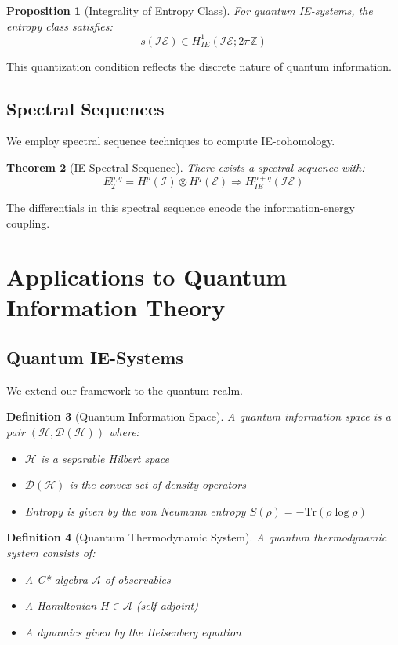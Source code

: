 \documentclass[12pt]{article}
\newtheorem{theorem}{Theorem}[section]
\newtheorem{proposition}[theorem]{Proposition}
\newtheorem{definition}[theorem]{Definition}
\begin{document}
\begin{proposition}[Integrality of Entropy Class]
For quantum IE-systems, the entropy class satisfies:
\[s(\mathcal{IE}) \in H^1_{IE}(\mathcal{IE}; 2\pi\mathbb{Z})\]
\end{proposition}

This quantization condition reflects the discrete nature of quantum information.

\subsection{Spectral Sequences}

We employ spectral sequence techniques to compute IE-cohomology.

\begin{theorem}[IE-Spectral Sequence]
There exists a spectral sequence with:
\[E_2^{p,q} = H^p(\mathcal{I}) \otimes H^q(\mathcal{E}) \Rightarrow H^{p+q}_{IE}(\mathcal{IE})\]
\end{theorem}

The differentials in this spectral sequence encode the information-energy coupling.

\section{Applications to Quantum Information Theory}

\subsection{Quantum IE-Systems}

We extend our framework to the quantum realm.

\begin{definition}[Quantum Information Space]
A quantum information space is a pair $(\mathcal{H}, \mathcal{D}(\mathcal{H}))$ where:
\begin{itemize}
\item $\mathcal{H}$ is a separable Hilbert space
\item $\mathcal{D}(\mathcal{H})$ is the convex set of density operators
\item Entropy is given by the von Neumann entropy $S(\rho) = -\text{Tr}(\rho \log \rho)$
\end{itemize}
\end{definition}

\begin{definition}[Quantum Thermodynamic System]
A quantum thermodynamic system consists of:
\begin{itemize}
\item A C*-algebra $\mathcal{A}$ of observables
\item A Hamiltonian $H \in \mathcal{A}$ (self-adjoint)
\item A dynamics given by the Heisenberg equation
\end{itemize}
\end{definition}
\end{document}
